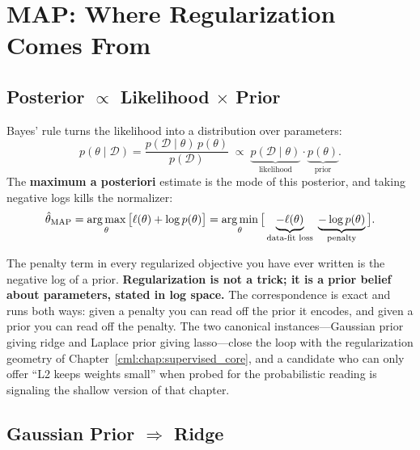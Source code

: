 \section{MAP: Where Regularization Comes From}
\label{cml:sec:map}

\subsection{Posterior $\propto$ Likelihood $\times$ Prior}

Bayes' rule turns the likelihood into a distribution over parameters:
\begin{equation}
p(\theta \mid \mathcal{D}) = \frac{p(\mathcal{D} \mid \theta)\, p(\theta)}{p(\mathcal{D})} \;\propto\; \underbrace{p(\mathcal{D}\mid\theta)}_{\text{likelihood}} \cdot \underbrace{p(\theta)}_{\text{prior}} .
\end{equation}
The \textbf{maximum a posteriori} estimate is the mode of this posterior, and taking negative logs kills the normalizer:
\begin{equation}
\hat\theta_{\text{MAP}} = \operatorname*{arg\,max}_\theta \big[\ell(\theta) + \log p(\theta)\big] = \operatorname*{arg\,min}_\theta \big[\underbrace{-\ell(\theta)}_{\text{data-fit loss}} \; \underbrace{-\log p(\theta)}_{\text{penalty}}\big].
\end{equation}

\begin{keyinsight}
The penalty term in every regularized objective you have ever written is the negative log of a prior. \textbf{Regularization is not a trick; it is a prior belief about parameters, stated in log space.} The correspondence is exact and runs both ways: given a penalty you can read off the prior it encodes, and given a prior you can read off the penalty. The two canonical instances---Gaussian prior giving ridge and Laplace prior giving lasso---close the loop with the regularization geometry of Chapter~\ref{cml:chap:supervised_core}, and a candidate who can only offer ``L2 keeps weights small'' when probed for the probabilistic reading is signaling the shallow version of that chapter.
\end{keyinsight}

\subsection{Gaussian Prior $\Rightarrow$ Ridge}

